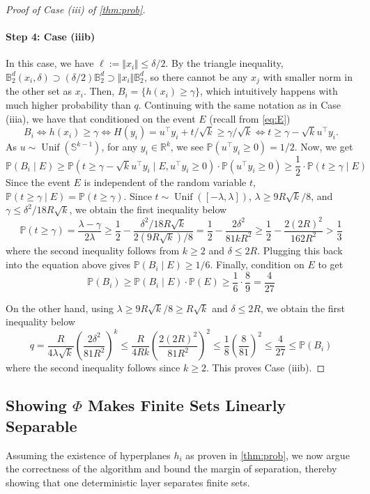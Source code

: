 \documentclass[aoap]{imsart}
\numberwithin{equation}{section}
\theoremstyle{definition}
\theoremstyle{remark}
\numberwithin{equation}{section}
\renewcommand{\S}{\mathbb{S}}
\newcommand{\0}{\mathbf{0}}
\newcommand{\1}{\mathbf{1}}
\renewcommand{\P}{\mathbb{P}}
\newcommand{\B}{\mathbb{B}}
\renewcommand{\S}{\mathbb{S}}
\DeclareMathOperator{\Unif}{Unif}
\numberwithin{equation}{section}
\begin{document}
\begin{proof}[Proof of Case (iii) of \cref{thm:prob}]
\paragraph{Step 4: Case (iiib)}
In this case, we have  $\ell := \Vert x_i\Vert \leq\delta/2$. By the triangle inequality, $\B_2^d(x_i, \delta)\supset (\delta/2) \B_2^d\supset \Vert x_i\Vert \B_2^d$, so there cannot be any $x_j$ with smaller norm in the other set as $x_i$. Then, $B_i = \lbrace h(x_i)\geq \gamma\rbrace$, which intuitively happens with much higher probability than $q$. Continuing with the same notation as in Case (iiia), we have that conditioned on the event $E$ (recall from \eqref{eq:E})
\[B_i\iff h(x_i)\geq \gamma \iff H(y_i) = u^{\intercal}y_i+t/\sqrt{k}\geq \gamma/\sqrt{k}\iff t\geq \gamma -\sqrt{k}u^{\intercal}y_i.\]
As $u\sim\Unif(\S^{k-1})$, for any $y_i \in \mathbb{R}^k$, we see $\P(u^{\intercal}y_i\geq 0)=1/2$. Now, we get
\[
    \P(B_i\mid E) \geq \P\left(t\geq \gamma -\sqrt{k}u^{\intercal}y_i\mid E, u^{\intercal}y_i\geq 0\right)\cdot \P( u^{\intercal}y_i\geq 0) \geq \frac{1}{2} \cdot \P\left(t\geq \gamma\mid E\right)
\]
Since the event $E$ is independent of the random variable $t$, $\P\left(t\geq \gamma\mid E\right) =\P\left(t\geq \gamma\right)$. Since $t\sim\Unif([-\lambda, \lambda])$, $\lambda\geq 9R\sqrt{k}/8$, and $\gamma \leq \delta^2/18R\sqrt{k}$, we obtain the first inequality below
\[ \P(t\geq \gamma)= \frac{\lambda-\gamma}{2\lambda}\geq \frac{1}{2}-\frac{\delta^2/18R\sqrt{k}}{2(9R\sqrt{k})/8}=\frac{1}{2}-\frac{2\delta^2}{81kR^2}\geq \frac{1}{2}-\frac{2(2R)^2}{162R^2}> \frac{1}{3}\]
where the second inequality follows from $k\geq 2$ and $\delta \leq 2R$. Plugging this back into the equation above gives $\P(B_i\mid E)\geq 1/6$. Finally, condition on $E$ to get
\[ \P(B_i)\geq \P(B_i\mid E)\cdot \P(E)\geq \frac{1}{6}\cdot \frac{8}{9} = \frac{4}{27}\]

On the other hand, using $\lambda \geq 9R\sqrt{k}/8\geq R\sqrt{k}$ and $\delta \leq 2R$, we obtain the first inequality below
\[
q = \frac{R}{4\lambda\sqrt{k}}\left(\frac{2\delta^2}{81R^2}\right)^k \leq \frac{R}{4Rk}\left(\frac{2(2R)^2}{81R^2}\right)^2 \leq \frac{1}{8}\left(\frac{8}{81}\right)^2\leq \frac{4}{27}\leq \P(B_i)
\]
where the second inequality follows since $k\geq 2$. This proves Case (iiib).
\end{proof}
\subsection{Showing $\Phi$ Makes Finite Sets Linearly Separable}
Assuming the existence of hyperplanes $h_i$ as proven in \cref{thm:prob}, we now argue the correctness of the algorithm and bound the margin of separation, thereby showing that one deterministic layer separates finite sets.
\end{document}

